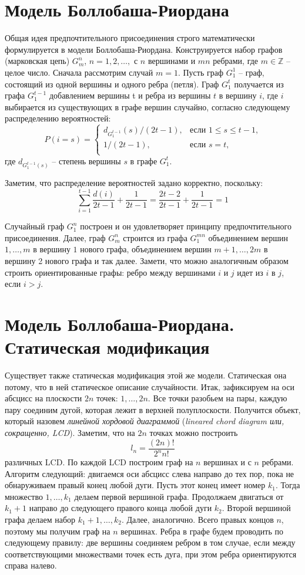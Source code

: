 \documentclass[14pt]{extreport}
\begin{document}
\section{Модель Боллобаша-Риордана}

Общая идея предпочтительного присоединения строго математически формулируется в модели Боллобаша-Риордана. Конструируется набор графов (марковская цепь) $G_m^n$, $n=1, 2, \dots,$ с $n$ вершинами и $mn$ ребрами, где $m \in \mathbb{Z}$ -- целое число. Сначала рассмотрим случай $m = 1$. Пусть граф $G_1^1$ -- граф, состоящий из одной вершины и одного ребра (петля). Граф $G_1^t$ получается из графа $G_1^{t-1}$ добавлением вершины t и ребра из вершины $t$ в вершину $i$, где $i$ выбирается из существующих в графе вершин случайно, согласно следующему распределению вероятностей:
$$  
P(i=s) =
\begin{cases}  
  d_{G_1^{t-1}}(s)/(2t-1),&\text{если $1 \le s \le t-1$,}\\
  1/(2t-1),&\text{если $s=t$,}\\
\end{cases}
$$  
где $d_{G_1^{t-1}(s)}$ -- степень вершины $s$ в графе $G_1^t$. 

Заметим, что распределение вероятностей задано корректно, поскольку:
$$
\sum_{i=1}^{t-1}\frac{d(i)}{2t-1} + \frac{1}{2t-1}=\frac{2t-2}{2t-1}+\frac{1}{2t-1}=1
$$

Случайный граф $G_1^n$ построен и он удовлетворяет принципу предпочтительного присоединения. Далее, граф $G_m^n$ строится из графа $G_1^{mn}$ объединением вершин $1, \dots, m$ в вершину $1$ нового графа, объединением вершин $m+1, \dots, 2m$ в вершину 2 нового графа и так далее. Замети, что можно аналогичным образом строить ориентированные графы: ребро между вершинами $i$ и $j$ идет из $i$ в $j$, если $i > j$.

\section{Модель Боллобаша-Риордана. Статическая модификация}

Существует также статическая модификация этой же модели. Статическая она потому, что в ней статическое описание случайности.
Итак, зафиксируем на оси абсцисс на плоскости $2n$ точек: $1, \dots, 2n$. Все точки разобьем на пары, каждую пару соединим дугой, которая лежит в верхней полуплоскости. Получится объект, который назовем {\it линейной хордовой диаграммой} ({\it lineared chord diagram или, сокращенно, LCD}). Заметим, что на $2n$ точках можно построить
$$
l_n = \frac{(2n)!}{2^nn!}
$$
различных LCD. По каждой LCD построим граф на $n$ вершинах и с $n$ ребрами. Алгоритм следующий: двигаемся оси абсцисс слева направо до тех пор, пока не обнаруживаем правый конец любой дуги. Пусть этот конец имеет номер $k_1$. Тогда множество ${1, \dots, k_1}$ делаем первой вершиной графа. Продолжаем двигаться от $k_1 + 1$ направо до следующего правого конца любой дуги $k_2$. Второй вершиной графа делаем набор ${k_1 + 1, \dots, k_2}$. Далее, аналогично. Всего правых концов $n$, поэтому мы получим граф на $n$ вершинах. Ребра в графе будем проводить по следующему правилу: две вершины соединяем ребром в том случае, если между соответствующими множествами точек есть дуга, при этом ребра ориентируются справа налево.
\end{document}
